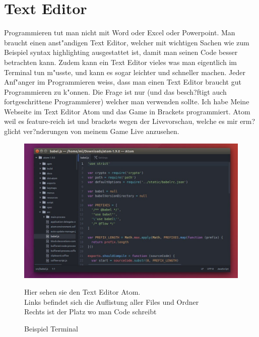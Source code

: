 \documentclass{article}
\begin{document}
\cleardoublepage































\section{Text Editor}

Programmieren tut man nicht mit Word oder Excel oder Powerpoint.
Man braucht einen anst"andigen Text Editor,
welcher mit wichtigen Sachen wie zum Beispiel syntax highlighting ausgestattet ist, damit man seinen Code besser betrachten kann.
Zudem kann ein Text Editor vieles was man eigentlich im Terminal tun m"usste, und kann es sogar leichter und schneller machen.
Jeder Anf"anger im Programmieren weiss, dass man einen Text Editor braucht gut Programmieren zu k"onnen.
Die Frage ist nur (und das besch?ftigt auch fortgeschrittene Programmierer) welcher man verwenden sollte.
Ich habe Meine Webseite im Text Editor Atom und das Game in Brackets programmiert.
Atom weil es feature-reich ist und brackets wegen der Livevorschau, welche es mir erm?glicht ver?nderungen von meinem Game Live anzusehen.
\begin{figure}[ht]
    \centering
    \includegraphics[width=.6\linewidth]{text-editor}
    \caption{Beispiel Terminal}
    \label{fig:sub1}{Hier sehen sie den Text Editor Atom.\\
    Links befindet sich die Auflistung aller Files und Ordner\\
    Rechts ist der Platz wo man Code schreibt}
    \end{figure}
\end{document}

